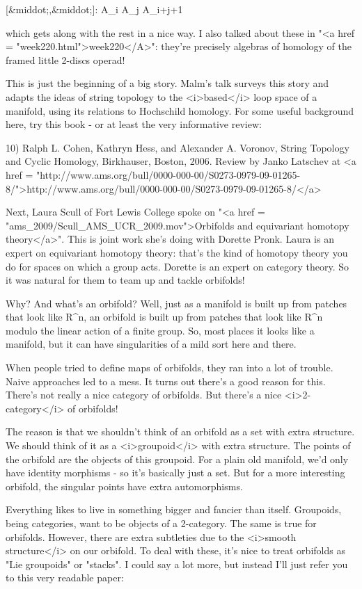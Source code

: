 [&middot;,&middot;]: A_{i} \otimes  A_{j} \to  A_{i+j+1}

which gets along with the rest in a nice way.  I also talked about
these in "<a href = "week220.html">week220</A>": they're
precisely algebras of homology of the framed little 2-discs operad!

This is just the beginning of a big story.  Malm's talk surveys this
story and adapts the ideas of string topology to the <i>based</i> loop 
space of a manifold, using its relations to Hochschild homology.
For some useful background here, try this book - or at least the
very informative review:

10) Ralph L. Cohen, Kathryn Hess, and Alexander A. Voronov, String
Topology and Cyclic Homology, Birkhauser, Boston, 2006.  Review by
Janko Latschev at <a href = "http://www.ams.org/bull/0000-000-00/S0273-0979-09-01265-8/">http://www.ams.org/bull/0000-000-00/S0273-0979-09-01265-8/</a>

Next, Laura Scull of Fort Lewis College spoke on 
"<a href = "ams_2009/Scull_AMS_UCR_2009.mov">Orbifolds 
and equivariant homotopy
theory</a>".  This is joint work she's doing with Dorette Pronk.
Laura is an expert on equivariant homotopy theory: that's the kind of
homotopy theory you do for spaces on which a group acts.  Dorette is
an expert on category theory.  So it was natural for them to team up
and tackle orbifolds!

Why?  And what's an orbifold?  Well, just as a manifold is built up
from patches that look like R^{n}, an orbifold is built up
from patches that look like R^{n} modulo the linear action of
a finite group.  So, most places it looks like a manifold, but it can
have singularities of a mild sort here and there.

When people tried to define maps of orbifolds, they ran into a lot of
trouble.  Naive approaches led to a mess.  It turns out there's a good
reason for this.  There's not really a nice category of orbifolds.
But there's a nice <i>2-category</i> of orbifolds!

The reason is that we shouldn't think of an orbifold as a set with
extra structure.  We should think of it as a <i>groupoid</i> with extra
structure.  The points of the orbifold are the objects of this
groupoid.  For a plain old manifold, we'd only have identity
morphisms - so it's basically just a set.  But for a more interesting
orbifold, the singular points have extra automorphisms.

Everything likes to live in something bigger and fancier than itself.
Groupoids, being categories, want to be objects of a 2-category.  The
same is true for orbifolds.  However, there are extra subtleties due
to the <i>smooth structure</i> on our orbifold.  To deal with these,
it's nice to treat orbifolds as "Lie groupoids" or
"stacks".  I could say a lot more, but instead I'll just
refer you to this very readable paper:

